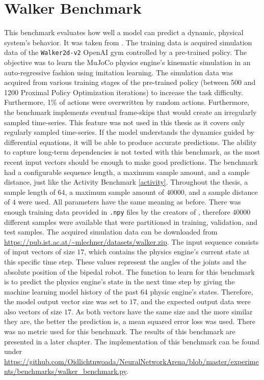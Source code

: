 \documentclass[draft,final]{vutinfth} %
\begin{document}
    \section{Walker Benchmark} \label{walker}
    This benchmark evaluates how well a model can predict a dynamic, physical system's behavior. It was taken from \cite{ODELSTM}.
    The training data is acquired simulation data of the \texttt{Walker2d-v2} OpenAI gym \cite{OpenAIGym} controlled by a pre-trained policy.
    The objective was to learn the MuJoCo physics engine’s kinematic simulation \cite{MuJoCo} in an auto-regressive fashion using imitation learning.
    The simulation data was acquired from various training stages of the pre-trained policy (between 500 and 1200 Proximal Policy Optimization iterations) to increase the task difficulty. Furthermore, 1\% of actions were overwritten by random actions.
    Furthermore, the benchmark implements eventual frame-skips that would create an irregularly sampled time-series. 
    This feature was not used in this thesis as it covers only regularly sampled time-series.
    If the model understands the dynamics guided by differential equations, it will be able to produce accurate predictions.
    The ability to capture long-term dependencies is not tested with this benchmark, as the most recent input vectors should be enough to make good predictions.
    The benchmark had a configurable sequence length, a maximum sample amount, and a sample distance, just like the Activity Benchmark \ref{activity}.
    Throughout the thesis, a sample length of $64$, a maximum sample amount of $40000$, and a sample distance of $4$ were used.
    All parameters have the same meaning as before.
    There was enough training data provided in \texttt{.npy} files by the creators of \cite{ODELSTM}, therefore $40000$ different samples were available that were partitioned in training, validation, and test samples.
    The acquired simulation data can be downloaded from \url{https://pub.ist.ac.at/~mlechner/datasets/walker.zip}.
    The input sequence consists of input vectors of size $17$, which contains the physics engine's current state at this specific time step.
    These values represent the angles of the joints and the absolute position of the bipedal robot.
    The function to learn for this benchmark is to predict the physics engine's state in the next time step by giving the machine learning model history of the past $64$ physic engine's states.
    Therefore, the model output vector size was set to $17$, and the expected output data were also vectors of size $17$.
    As both vectors have the same size and the more similar they are, the better the prediction is, a mean squared error loss was used.
    There was no metric used for this benchmark.
    The results of this benchmark are presented in a later chapter.
    The implementation of this benchmark can be found under \url{https://github.com/Oidlichtnwoada/NeuralNetworkArena/blob/master/experiments/benchmarks/walker_benchmark.py}.
\end{document}

